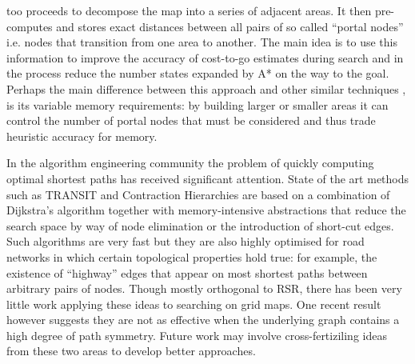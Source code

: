 too proceeds to decompose the map into a series of adjacent areas.  It then
pre-computes and stores exact distances between all pairs of so called ``portal nodes''
i.e. nodes that transition from one area to another. The main idea is to
use this information to improve the accuracy of cost-to-go estimates during
search and in the process reduce the number states expanded by A* on the way to
the goal.  Perhaps the main difference between this approach and other similar
techniques \cite{sturtevant09,felner09,bjornsson09}, is its variable memory
requirements: by building larger or smaller areas it can control the number of
portal nodes that must be considered and thus trade heuristic accuracy for 
memory.
\par
In the algorithm engineering community the problem of quickly computing optimal
shortest paths has received significant attention.
State of the art methods such as TRANSIT \cite{bast06} and Contraction Hierarchies
\cite{geisberger08} are based
on a combination of Dijkstra's algorithm together with memory-intensive 
abstractions that reduce the search space by way of node elimination or the
introduction of short-cut edges.  Such algorithms are very fast but they are
also highly optimised for road networks in which certain topological properties
hold true: for example, the existence of ``highway'' edges that appear on most
shortest paths between arbitrary pairs of nodes. Though mostly
orthogonal to RSR, there has been very
little work applying these ideas to searching on grid maps. One recent result
however \cite{sturtevant10} suggests they are not as effective when the underlying 
graph contains a high degree of path symmetry. Future work may involve 
cross-fertiziling ideas from these two areas to develop better approaches.
